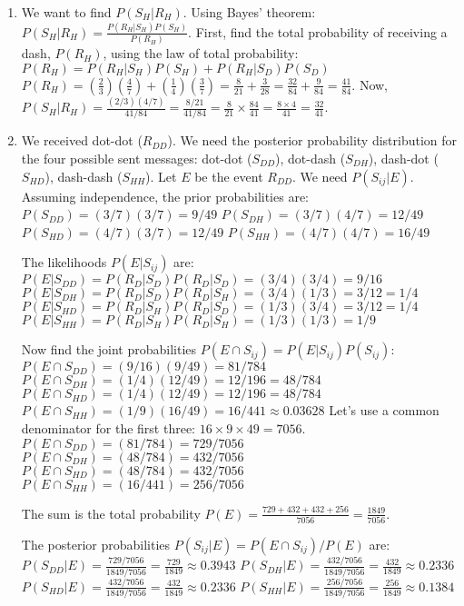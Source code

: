 \begin{enumerate}[label=(\alph*)]
    \item We want to find $P(S_H|R_H)$. Using Bayes' theorem: $P(S_H|R_H) = \frac{P(R_H|S_H)P(S_H)}{P(R_H)}$.
    First, find the total probability of receiving a dash, $P(R_H)$, using the law of total probability:
    $P(R_H) = P(R_H|S_H)P(S_H) + P(R_H|S_D)P(S_D)$
    $P(R_H) = (\frac{2}{3})(\frac{4}{7}) + (\frac{1}{4})(\frac{3}{7}) = \frac{8}{21} + \frac{3}{28} = \frac{32}{84} + \frac{9}{84} = \frac{41}{84}$.
    \vspace{1ex} %
    Now, $P(S_H|R_H) = \frac{(2/3)(4/7)}{41/84} = \frac{8/21}{41/84} = \frac{8}{21} \times \frac{84}{41} = \frac{8 \times 4}{41} = \frac{32}{41}$.

    \item We received dot-dot ($R_{DD}$). We need the posterior probability distribution for the four possible sent messages: dot-dot ($S_{DD}$), dot-dash ($S_{DH}$), dash-dot ($S_{HD}$), dash-dash ($S_{HH}$). Let $E$ be the event $R_{DD}$. We need $P(S_{ij}|E)$.
    Assuming independence, the prior probabilities are:
    $P(S_{DD}) = (3/7)(3/7) = 9/49$
    $P(S_{DH}) = (3/7)(4/7) = 12/49$
    $P(S_{HD}) = (4/7)(3/7) = 12/49$
    $P(S_{HH}) = (4/7)(4/7) = 16/49$

    The likelihoods $P(E|S_{ij})$ are:
    $P(E|S_{DD}) = P(R_D|S_D)P(R_D|S_D) = (3/4)(3/4) = 9/16$
    $P(E|S_{DH}) = P(R_D|S_D)P(R_D|S_H) = (3/4)(1/3) = 3/12 = 1/4$
    $P(E|S_{HD}) = P(R_D|S_H)P(R_D|S_D) = (1/3)(3/4) = 3/12 = 1/4$
    $P(E|S_{HH}) = P(R_D|S_H)P(R_D|S_H) = (1/3)(1/3) = 1/9$

    Now find the joint probabilities $P(E \cap S_{ij}) = P(E|S_{ij})P(S_{ij})$:
    $P(E \cap S_{DD}) = (9/16)(9/49) = 81/784$
    $P(E \cap S_{DH}) = (1/4)(12/49) = 12/196 = 48/784$
    $P(E \cap S_{HD}) = (1/4)(12/49) = 12/196 = 48/784$
    $P(E \cap S_{HH}) = (1/9)(16/49) = 16/441 \approx 0.03628$
    Let's use a common denominator for the first three: $16 \times 9 \times 49 = 7056$.
    $P(E \cap S_{DD}) = (81/784) = 729/7056$
    $P(E \cap S_{DH}) = (48/784) = 432/7056$
    $P(E \cap S_{HD}) = (48/784) = 432/7056$
    $P(E \cap S_{HH}) = (16/441) = 256/7056$

    The sum is the total probability $P(E) = \frac{729+432+432+256}{7056} = \frac{1849}{7056}$.

    The posterior probabilities $P(S_{ij}|E) = P(E \cap S_{ij})/P(E)$ are:
    $P(S_{DD}|E) = \frac{729/7056}{1849/7056} = \frac{729}{1849} \approx 0.3943$
    $P(S_{DH}|E) = \frac{432/7056}{1849/7056} = \frac{432}{1849} \approx 0.2336$
    $P(S_{HD}|E) = \frac{432/7056}{1849/7056} = \frac{432}{1849} \approx 0.2336$
    $P(S_{HH}|E) = \frac{256/7056}{1849/7056} = \frac{256}{1849} \approx 0.1384$
\end{enumerate}


